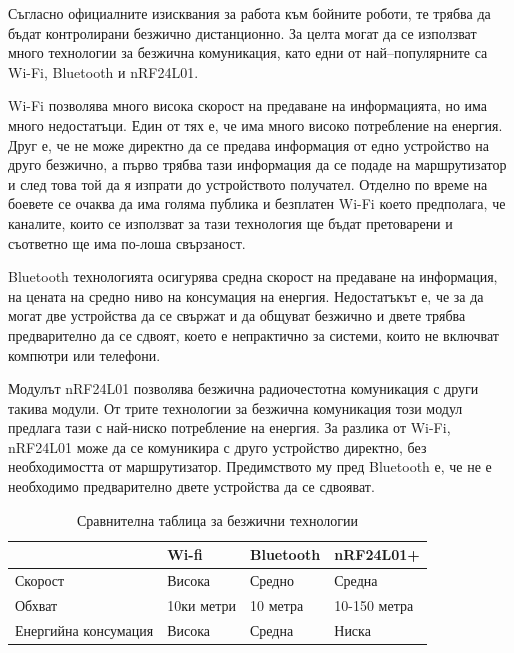 Съгласно официалните изисквания за работа към бойните роботи, те трябва да бъдат контролирани безжично дистанционно. За целта могат да се използват много технологии за безжична комуникация, като едни от най–популярните са Wi-Fi, Bluetooth и nRF24L01.

Wi-Fi позволява много висока скорост на предаване на информацията, но има много недостатъци. Един от тях е, че има много високо потребление на енергия. Друг е, че не може директно да се предава информация от едно устройство на друго безжично, а първо трябва тази информация да се подаде на маршрутизатор и след това той да я изпрати до устройството получател. Отделно по време на боевете се очаква да има голяма публика и безплатен Wi-Fi което предполага, че каналите, които се използват за тази технология ще бъдат претоварени и съответно ще има по-лоша свързаност. 

Bluetooth технологията осигурява средна скорост на предаване на информация, на цената на средно ниво на консумация на енергия. Недостатъкът е, че за да могат две устройства да се свържат и да общуват безжично и двете трябва предварително да се сдвоят, което е непрактично за системи, които не включват компютри или телефони.

Модулът nRF24L01 позволява безжична радиочестотна комуникация с други такива модули. От трите технологии за безжична комуникация този модул предлага тази с най-ниско потребление на енергия. За разлика от Wi-Fi, nRF24L01 може да се комуникира с друго устройство директно, без необходимостта от маршрутизатор. Предимството му пред Bluetooth е, че не е необходимо предварително двете устройства да се сдвояват.

\begin{table}[H]
    \centering
    \begin{tabular}{| m{4cm} | m{} | m{} | m{} |}
        \hline
        & Wi-fi & Bluetooth & nRF24L01+ \\
        \hline
        Скорост &  Висока & Средно & Средна \\
        \hline
        Обхват & 10ки метри & 10 метра & 10-150 метра \\
        \hline
        Енергийна консумация & Висока & Средна & Ниска\\
        \hline
    \end{tabular}
    \caption{Сравнителна таблица за безжични технологии}
    \label{table:wireless}
\end{table}



